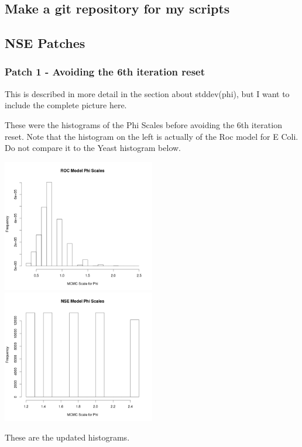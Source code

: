 \subsection{Make a git repository for my scripts}

\subsection{NSE Patches}

\subsubsection{Patch 1 - Avoiding the 6th iteration reset}

This is described in more detail in the section about stddev(phi), but I want to include the complete picture here.

These were the histograms of the Phi Scales before avoiding the 6th iteration reset. Note that the histogram on the left is actually of the Roc model for E Coli. Do not compare it to the Yeast histogram below.

\includegraphics[width=0.5\textwidth]{data/oct10-roc-scalehist.png}
\includegraphics[width=0.5\textwidth]{data/oct10-nse-scalehist.png}


These are the updated histograms.

